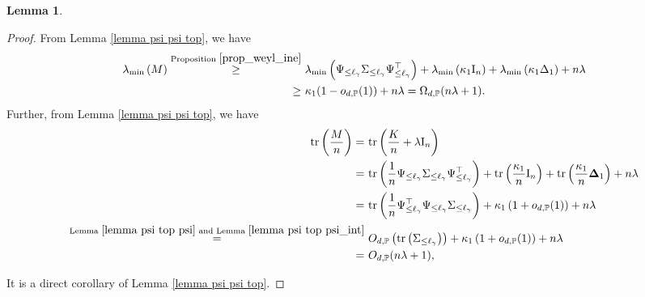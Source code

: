 \documentclass{article}
\theoremstyle{plain}
\newtheorem{lemma}[theorem]{Lemma}
\theoremstyle{definition}
\theoremstyle{remark}
\begin{document}
\begin{appendix}
\begin{lemma}
\begin{itemize}
\end{itemize}
\end{lemma}
\begin{proof}
 From Lemma \ref{lemma psi psi top}, we have 
\begin{equation*}
        \begin{aligned}
        \lambda_{\text{min}}\left( M\right) \overset{\text{Proposition } \ref{prop_weyl_ine}}{\geq}&~ \lambda_{\text{min}} \left( \Psi_{\leq \ell_{\gamma}} \Sigma_{\leq \ell_{\gamma}} \Psi_{\leq \ell_{\gamma}}^{\top} \right) + \lambda_{\text{min}} \left( \kappa_{1} \mathrm{I}_{n} \right) + \lambda_{\text{min}} \left( \kappa_{1} \Delta_{1} \right) + n\lambda\\
        \geq &~ \kappa_{1}(1-o_{d, \mathbb{P}}(1)) + n\lambda
        = \Omega_{d, \mathbb{P}}(n\lambda+1).
    \end{aligned}
\end{equation*}
Further, from Lemma \ref{lemma psi psi top}, we have
\begin{equation*}
        \begin{aligned}
\mathrm{tr}\left(\frac{M}{n}\right) 
=&~ \mathrm{tr}\left( \frac{K}{n} +\lambda \mathrm{I}_{n} \right)\\
=&~ \mathrm{tr}\left( \frac{1}{n} \Psi_{\leq \ell_{\gamma}} \Sigma_{\leq \ell_{\gamma}} \Psi_{\leq \ell_{\gamma}}^{\top} \right) + \mathrm{tr}\left( \frac{\kappa_{1}}{n} \mathrm{I}_{n}  \right) + \mathrm{tr}\left( \frac{\kappa_{1}}{n} \mathbf{\Delta}_{1}  \right) + n\lambda   \\
=&~ \mathrm{tr}\left( \frac{1}{n} \Psi_{\leq \ell_{\gamma}}^{\top} \Psi_{\leq \ell_{\gamma}} \Sigma_{\leq \ell_{\gamma}} \right) + \kappa_{1} \left( 1 + o_{d, \mathbb{P}}(1)\right) + n\lambda   \\
\overset{\text{Lemma } \ref{lemma psi top psi} \text{ and Lemma } \ref{lemma psi top psi_int}}{=}&~ O_{d, \mathbb{P}}\left(\mathrm{tr}\left(  \Sigma_{\leq \ell_{\gamma}}\right)\right) 
+ \kappa_{1} \left( 1 + o_{d, \mathbb{P}}(1)\right) + n\lambda   \\
=&~ O_{d, \mathbb{P}}(n\lambda+1),  
    \end{aligned}
\end{equation*}

 It is a direct corollary of Lemma \ref{lemma psi psi top}.




\end{proof}
\end{appendix}
\end{document}
